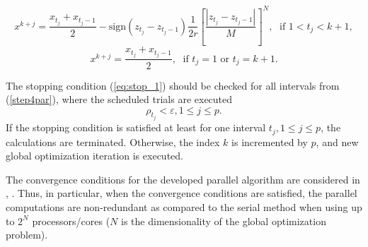 \documentclass{aims}
\theoremstyle{definition}
\begin{document}
\begin{equation} \label{step5par}
x^{k+j}=\frac{x_{t_j}+x_{t_j-1}}{2}-\mathrm{sign}(z_{t_j}-z_{t_j-1})\frac{1}{2r}\left[\frac{|z_{t_j}-z_{t_j-1}|}{M}\right]^N,\; \textrm{ if } 1<t_j<k+1,
\end{equation}
\[
x^{k+j}=\frac{x_{t_j}+x_{t_j-1}}{2},\; \textrm{ if } t_j=1 \textrm{ or } t_j=k+1.
\]
\par
The stopping condition (\ref{eq:stop_1}) should be checked for all intervals from (\ref{step4par}),
where the scheduled trials are executed
\begin{equation}
  \label{eq:stop}
\rho_{t_j}<\varepsilon,1\leq j\leq p.
\end{equation}
If the stopping condition is satisfied at least for one interval \(t_j, 1\le j\le p\), the calculations
are terminated. Otherwise, the index \(k\) is incremented by \(p\), and new global optimization iteration is executed.
\par
The convergence conditions for the developed parallel algorithm are considered
in \cite{stronginGergelBarkalovParGO}, \cite{strSergGO}. Thus, in particular, when the convergence conditions are
satisfied, the parallel computations are non-redundant as compared to the serial method
when using up to \(2^N\) processors/cores (\(N\) is the dimensionality of the global optimization problem).
\end{document}
